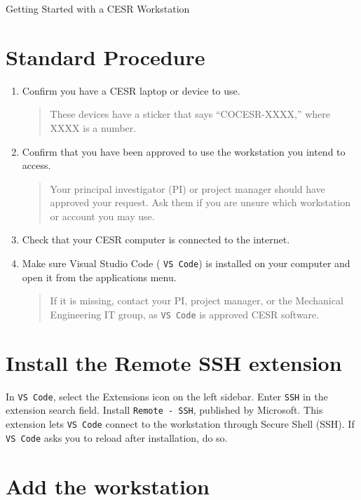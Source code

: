 \documentclass[12pt]{article}
\newcommand{\program}[1]{\begingroup\setlength{\fboxsep}{2pt}%
  \colorbox{ProgramBackground}{\texttt{#1}}\endgroup}
\begin{document}
{\centering\LARGE Getting Started with a CESR Workstation\par}
\vspace{6pt}
\thispagestyle{fancy}


\section*{Standard Procedure}

\begin{enumerate}
\item Confirm you have a CESR laptop or device to use. 
\begin{quote}
These devices have a sticker that says ``COCESR-XXXX,'' where XXXX is a number.
\end{quote}

\item Confirm that you have been approved to use the workstation you intend to access.
\begin{quote}
Your principal investigator (PI) or project manager should have approved your request. Ask them if you are unsure which workstation or account you may use.
\end{quote}

\item Check that your CESR computer is connected to the internet.

\item Make sure Visual Studio Code (\program{VS Code}) is installed on your computer and open it from the applications menu.
\begin{quote}
If it is missing, contact your PI, project manager, or the Mechanical Engineering IT group, as \program{VS Code} is approved CESR software.
\end{quote}
\end{enumerate}

\section*{Install the Remote SSH extension}

In \program{VS Code}, select the Extensions icon on the left sidebar. Enter \program{SSH} in the extension search field. Install \program{Remote - SSH}, published by Microsoft. This extension lets \program{VS Code} connect to the workstation through Secure Shell (SSH). If \program{VS Code} asks you to reload after installation, do so.

\section*{Add the workstation}
\end{document}
